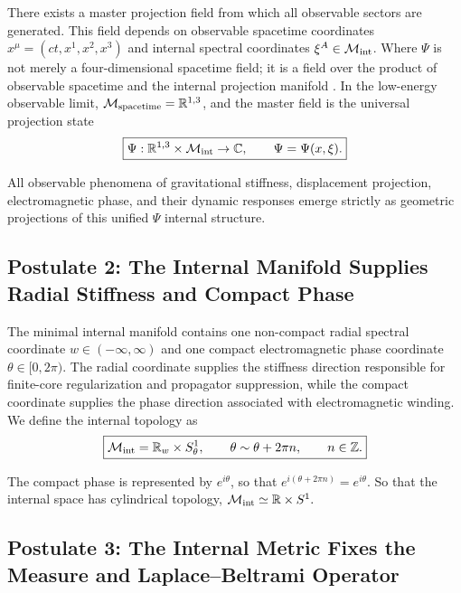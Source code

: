 \documentclass[11pt]{article}
\begin{document}
There exists a master projection field from which all observable sectors are generated. This field depends on observable spacetime coordinates \(x^\mu=(ct,x^1,x^2,x^3)\) and internal spectral coordinates \(\xi^A\in\mathcal M_{\rm int}\). Where \(\Psi\) is not merely a four-dimensional spacetime field; it is a field over the product of observable spacetime and the internal projection manifold \cite{Steenrod1951, KobayashiNomizu1963}. In the low-energy observable limit, \(\mathcal M_{\rm spacetime}=\mathbb R^{1,3}\), and the master field is the universal projection state
\begin{equation}
\boxed{
\Psi:
\mathbb R^{1,3}
\times
\mathcal M_{\rm int}
\rightarrow
\mathbb C,
\qquad
\Psi=\Psi(x,\xi).
}
\end{equation}

All observable phenomena of gravitational stiffness, displacement projection, electromagnetic phase, and their dynamic responses emerge strictly as geometric projections of this unified \(\Psi\) internal structure.

\subsection{Postulate 2: The Internal Manifold Supplies Radial Stiffness and Compact Phase}
\label{sec:postulate_internal_manifold_radial_stiffness_compact_phase}

The minimal internal manifold contains one non-compact radial spectral coordinate \(w\in(-\infty,\infty)\) and one compact electromagnetic phase coordinate \(\theta\in[0,2\pi)\). The radial coordinate supplies the stiffness direction responsible for finite-core regularization and propagator suppression, while the compact coordinate supplies the phase direction associated with electromagnetic winding. We define the internal topology as
\begin{equation}
\boxed{
\mathcal M_{\rm int}
=
\mathbb R_w
\times
S^1_\theta,
\qquad
\theta\sim\theta+2\pi n,
\qquad
n\in\mathbb Z.
}
\end{equation}

The compact phase is represented by \(e^{i\theta}\), so that \(e^{i(\theta+2\pi n)}=e^{i\theta}\). So that the internal space has cylindrical topology, \(\mathcal M_{\rm int}\simeq\mathbb R\times S^1.
\)

\subsection{Postulate 3: The Internal Metric Fixes the Measure and Laplace--Beltrami Operator}
\label{sec:postulate_internal_metric_measure_laplacian}
\end{document}
